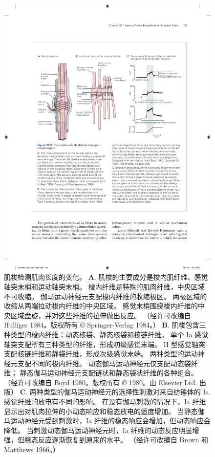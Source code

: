 \begin{figure}[htbp]
	\centering
	\includegraphics[width=0.9\linewidth]{chap32/fig_32_2}
	\caption{肌梭检测肌肉长度的变化。
	\textbf{A}. 肌梭的主要成分是梭内肌纤维、感觉轴突末梢和运动轴突末梢。
	梭内纤维是特殊的肌肉纤维，中央区域不可收缩。 伽马运动神经元支配梭内纤维的收缩极区。
	两极区域的收缩从两端拉动梭内纤维的中央区域。
	感觉末梢围绕梭内纤维的中央区域盘旋，并对这些纤维的拉伸做出反应。 （经许可改编自 Hulliger 1984。版权所有 © Springer-Verlag 1984。） 
	\textbf{B}. 肌梭包含三种类型的梭内纤维：动态核袋、静态核袋和核链纤维。
	单个 Ia 感觉轴突支配所有三种类型的纤维，形成初级感觉末端。
	II 型感觉轴突支配核链纤维和静袋纤维，形成次级感觉末端。
	两种类型的运动神经元支配不同的梭内纤维。
	动态伽马运动神经元仅支配动态袋纤维； 静态伽马运动神经元支配链状和静态袋状纤维的各种组合。 （经许可改编自 Boyd 1980。版权所有 © 1980。由 Elsevier Ltd. 出版） 
	\textbf{C}. 两种类型的伽马运动神经元的选择性刺激对来自纺锤体的 Ia 感觉纤维的放电有不同的影响。
	在没有伽马刺激的情况下，Ia 纤维显示出对肌肉拉伸的小动态响应和稳态放电的适度增加。
	当静态伽马运动神经元受到刺激时，Ia 纤维的稳态响应会增加，但动态响应会降低。
	当刺激动态伽马运动神经元时，Ia 纤维的动态反应明显增强，但稳态反应逐渐恢复到原来的水平。 （经许可改编自 Brown 和 Matthews 1966。）}
	\label{fig:32_2}
\end{figure}


